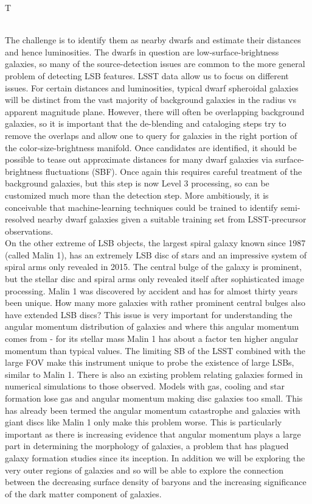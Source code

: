 \begin{tasklist}{T}
\begin{task}
{\\
The challenge is to identify them as nearby dwarfs and estimate their distances and hence luminosities. The dwarfs in question are low-surface-brightness galaxies, so many of the source-detection issues are common to the more general problem of detecting LSB features. LSST data allow us to focus on different issues. For certain distances and luminosities, typical dwarf spheroidal galaxies will be distinct from the vast majority of background galaxies in the radius vs apparent magnitude plane. However, there will often be overlapping background galaxies, so it is important that the de-blending and cataloging steps try to remove the overlaps and allow one to query for galaxies in the right portion of the color-size-brightness manifold. Once candidates are identified, it should be possible to tease out approximate distances for many dwarf galaxies via surface-brightness fluctuations (SBF). Once again this requires careful treatment of the background galaxies, but this step is now Level 3 processing, so can be customized much more than the detection step. More ambitiously, it is conceivable that machine-learning techniques could be trained to identify semi-resolved nearby dwarf galaxies given a suitable training set from LSST-precursor observations.
\\
On the other extreme of LSB objects, the largest spiral galaxy known since 1987 (called Malin 1), has an extremely LSB disc of stars and an impressive system of spiral arms only revealed in 2015. The central bulge of the galaxy is prominent, but the stellar disc and spiral arms only revealed itself after sophisticated image processing. Malin 1 was discovered by accident and has for almost thirty years been unique. How many more galaxies with rather prominent central bulges also have extended LSB discs? This issue is very important for understanding the angular momentum distribution of galaxies and where this angular momentum comes from - for its stellar mass Malin 1 has about a factor ten higher angular momentum than typical values. The limiting SB of the LSST combined with the large FOV make this instrument unique to probe the existence of large LSBs, similar to Malin 1. There is also an existing problem relating galaxies formed in numerical simulations to those observed. Models with gas, cooling and star formation lose gas and angular momentum making disc galaxies too small. This has already been termed the angular momentum catastrophe and galaxies with giant discs like Malin 1 only make this problem worse. This is particularly important as there is increasing evidence that angular momentum plays a large part in determining the morphology of galaxies, a problem that has plagued galaxy formation studies since its inception.  In addition we will be exploring the very outer regions of galaxies and so will be able to explore the connection between the decreasing surface density of baryons and the increasing significance of the dark matter component of galaxies.
}
\end{task}
\end{tasklist}
